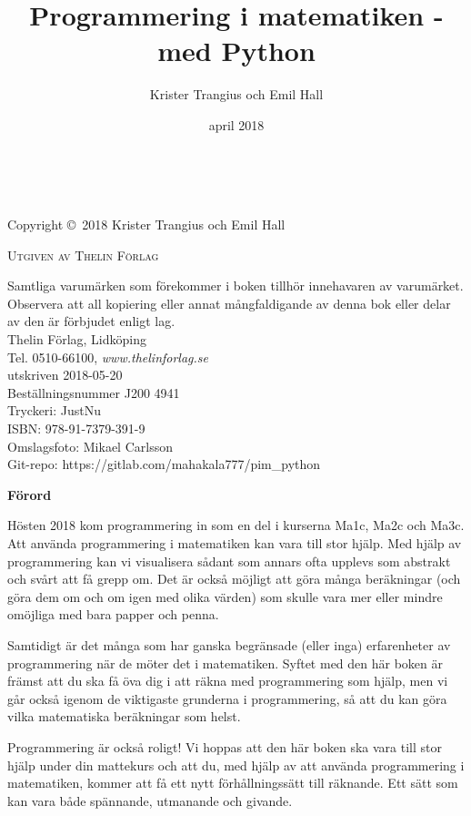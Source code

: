 \documentclass[14pt]{extbook}
\title{Programmering i matematiken - med Python}
\author{Krister Trangius och Emil Hall}
\date{april 2018}
\begin{document}
\newpage
~\vfill
\thispagestyle{empty}

\noindent Copyright \copyright\ 2018 Krister Trangius och Emil Hall %

\noindent \textsc{Utgiven av Thelin Förlag} %


\noindent Samtliga varumärken som förekommer i boken tillhör innehavaren av varumärket. Observera att all kopiering eller annat mångfaldigande av denna bok eller delar av den är förbjudet enligt lag.\\
Thelin Förlag, Lidköping\\
Tel. 0510-66100, \emph{www.thelinforlag.se}\\
utskriven 2018-05-20\\
Beställningsnummer J200 4941\\
Tryckeri: JustNu\\
ISBN: 978-91-7379-391-9\\
Omslagsfoto: Mikael Carlsson\\
Git-repo: https://gitlab.com/mahakala777/pim_python\\
\newpage

\newpage
\thispagestyle{empty}
{\Large{\textbf{Förord}}}

Hösten 2018 kom programmering in som en del i kurserna Ma1c, Ma2c och Ma3c. Att använda programmering i matematiken kan vara till stor hjälp. Med hjälp av programmering kan vi visualisera sådant som annars ofta upplevs som abstrakt och svårt att få grepp om. Det är också möjligt att göra många beräkningar (och göra dem om och om igen med olika värden) som skulle vara mer eller mindre omöjliga med bara papper och penna.

Samtidigt är det många som har ganska begränsade (eller inga) erfarenheter av programmering när de möter det i matematiken. Syftet med den här boken är främst att du ska få öva dig i att räkna med programmering som hjälp, men vi går också igenom de viktigaste grunderna i programmering, så att du kan göra  vilka matematiska beräkningar som helst.

Programmering är också roligt! Vi hoppas att den här boken ska vara till stor hjälp under din mattekurs och att du, med hjälp av att använda programmering i matematiken, kommer att få ett nytt förhållningssätt till räknande. Ett sätt som kan vara både spännande, utmanande och givande.
\end{document}
